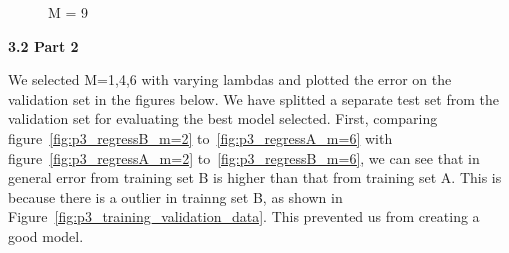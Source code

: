 \begin{figure}[!htb]
  \caption{M = 9}\label{fig:figures/p3_bishop_m=9}
\endminipage\hfill
\end{figure}

{\bfseries 3.2 Part 2}

We selected M=1,4,6 with varying lambdas and plotted the error on the validation set in the figures below. We have splitted a separate test set from the validation set for evaluating the best model selected. 
First, comparing figure~\ref{fig:p3_regressB_m=2} to~\ref{fig:p3_regressA_m=6} with figure~\ref{fig:p3_regressA_m=2} to~\ref{fig:p3_regressB_m=6}, we can see that in general error from training set B is higher than that from training set A. This is because there is a outlier in trainng set B, as shown in Figure~\ref{fig:p3_training_validation_data}. This prevented us from creating a good model. 

